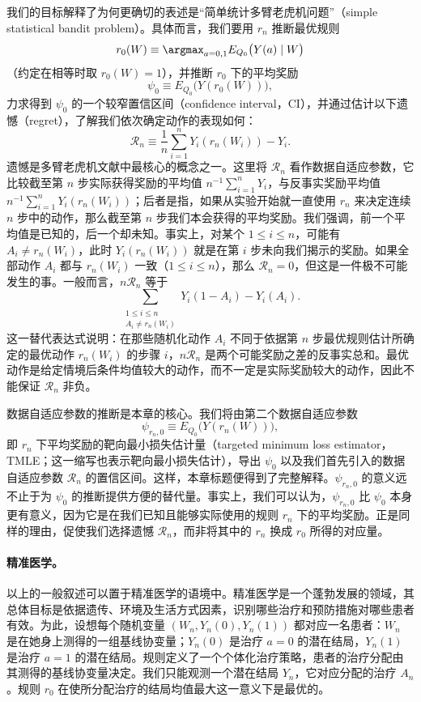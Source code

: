 我们的目标解释了为何更确切的表述是“简单统计多臂老虎机问题”（simple statistical bandit problem）。具体而言，我们要用 $r_n$ 推断最优规则
\[
 r_0(W)\equiv\argmax_{a=0,1}E_{Q_0}\bigl(Y(a)\mid W\bigr)
\]
（约定在相等时取 $r_0(W)=1$），并推断 $r_0$ 下的平均奖励
\[
 \psi_0\equiv E_{Q_0}\bigl(Y(r_0(W))\bigr),
\]
力求得到 $\psi_0$ 的一个较窄置信区间（confidence interval，CI），并通过估计以下遗憾（regret），了解我们依次确定动作的表现如何：
\[
 \mathcal R_n\equiv\frac1n\sum_{i=1}^n Y_i(r_n(W_i))-Y_i.
\]
遗憾是多臂老虎机文献中最核心的概念之一。这里将 $\mathcal R_n$ 看作数据自适应参数，它比较截至第 $n$ 步实际获得奖励的平均值 $n^{-1}\sum_{i=1}^nY_i$，与反事实奖励平均值 $n^{-1}\sum_{i=1}^nY_i(r_n(W_i))$；后者是指，如果从实验开始就一直使用 $r_n$ 来决定连续 $n$ 步中的动作，那么截至第 $n$ 步我们本会获得的平均奖励。我们强调，前一个平均值是已知的，后一个却未知。事实上，对某个 $1\leq i\leq n$，可能有 $A_i\ne r_n(W_i)$，此时 $Y_i(r_n(W_i))$ 就是在第 $i$ 步未向我们揭示的奖励。如果全部动作 $A_i$ 都与 $r_n(W_i)$ 一致（$1\leq i\leq n$），那么 $\mathcal R_n=0$，但这是一件极不可能发生的事。一般而言，$n\mathcal R_n$ 等于
\[
 \sum_{\substack{1\leq i\leq n\\A_i\ne r_n(W_i)}}Y_i(1-A_i)-Y_i(A_i).
\]
这一替代表达式说明：在那些随机化动作 $A_i$ 不同于依据第 $n$ 步最优规则估计所确定的最优动作 $r_n(W_i)$ 的步骤 $i$，$n\mathcal R_n$ 是两个可能奖励之差的反事实总和。最优动作是给定情境后条件均值较大的动作，而不一定是实际奖励较大的动作，因此不能保证 $\mathcal R_n$ 非负。

数据自适应参数的推断是本章的核心。我们将由第二个数据自适应参数
\[
 \psi_{r_n,0}\equiv E_{Q_0}\bigl(Y(r_n(W))\bigr),
\]
即 $r_n$ 下平均奖励的靶向最小损失估计量（targeted minimum loss estimator，TMLE；这一缩写也表示靶向最小损失估计），导出 $\psi_0$ 以及我们首先引入的数据自适应参数 $\mathcal R_n$ 的置信区间。这样，本章标题便得到了完整解释。$\psi_{r_n,0}$ 的意义远不止于为 $\psi_0$ 的推断提供方便的替代量。事实上，我们可以认为，$\psi_{r_n,0}$ 比 $\psi_0$ 本身更有意义，因为它是在我们已知且能够实际使用的规则 $r_n$ 下的平均奖励。正是同样的理由，促使我们选择遗憾 $\mathcal R_n$，而非将其中的 $r_n$ 换成 $r_0$ 所得的对应量。

\paragraph*{精准医学。}
以上的一般叙述可以置于精准医学的语境中。精准医学是一个蓬勃发展的领域，其总体目标是依据遗传、环境及生活方式因素，识别哪些治疗和预防措施对哪些患者有效。为此，设想每个随机变量 $(W_n,Y_n(0),Y_n(1))$ 都对应一名患者：$W_n$ 是在她身上测得的一组基线协变量；$Y_n(0)$ 是治疗 $a=0$ 的潜在结局，$Y_n(1)$ 是治疗 $a=1$ 的潜在结局。规则定义了一个个体化治疗策略，患者的治疗分配由其测得的基线协变量决定。我们只能观测一个潜在结局 $Y_n$，它对应分配的治疗 $A_n$。规则 $r_0$ 在使所分配治疗的结局均值最大这一意义下是最优的。


